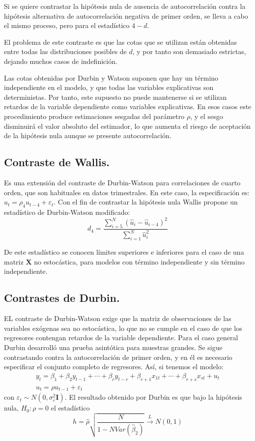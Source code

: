 Si se quiere contrastar la hip\'otesis nula de ausencia de autocorrelaci\'on
contra la hip\'otesis alternativa de autocorrelaci\'on negativa de primer
orden, se lleva a cabo el mismo proceso, pero para el estad\'istico
$4-d$.

El problema de este contraste es que las cotas que se utilizan est\'an
obtenidas entre todas las distribuciones posibles de $d$, y por tanto
son demasiado estrictas, dejando muchos casos de indefinici\'on.

Las cotas obtenidas por Durbin y Watson suponen que hay un t\'ermino
independiente en el modelo, y que todas las variables explicativas
son deterministas. Por tanto, este supuesto no puede mantenerse si
se utilizan retardos de la variable dependiente como variables explicativas.
En esos casos este procedimiento produce estimaciones sesgadas del
par\'ametro $\rho$, y el sesgo disminuir\'a el valor absoluto del estimador,
lo que aumenta el riesgo de aceptaci\'on de la hip\'otesis nula aunque
se presente autocorrelaci\'on.


\subsection{Contraste de Wallis.}

Es una extensi\'on del contraste de Durbin-Watson para correlaciones
de cuarto orden, que son habituales en datos trimestrales. En este
caso, la especificaci\'on es: $u_{t}=\rho_{4}u_{t-4}+\varepsilon_{t}$.
Con el fin de contrastar la hip\'otesis nula Wallis propone un estad\'istico
de Durbin-Watson modificado: 
\[
d_{4}=\dfrac{\sum_{i=5}^{N}\left(\hat{u}_{i}-\hat{u}_{i-4}\right)^{2}}{\sum_{i=1}^{N}\hat{u}_{i}^{2}}
\]


De este estad\'istico se conocen l\'imites superiores e inferiores para
el caso de una matriz $\boldsymbol{X}$ no estoc\'astica, para modelos
con t\'ermino independiente y sin t\'ermino independiente.


\subsection{Contrastes de Durbin.}

EL contraste de Durbin-Watson exige que la matriz de observaciones
de las variables ex\'ogenas sea no estoc\'astica, lo que no se cumple
en el caso de que los regresores contengan retardos de la variable
dependiente. Para el caso general Durbin desarroll\'o una prueba asint\'otica
para muestras grandes. Se sigue contrastando contra la autocorrelaci\'on
de primer orden, y en \'el es necesario especificar el conjunto completo
de regresores. As\'i, si tenemos el modelo: 
\[
\begin{array}{c}
y_{t}=\beta_{1}+\beta_{2}y_{t-1}+\cdots+\beta_{r}y_{t-r}+\beta_{r+1}x_{1t}+\cdots+\beta_{r+s}x_{st}+u_{t}\\
u_{t}=\rho u_{t-1}+\varepsilon_{t}
\end{array}
\]
 con $\varepsilon_{t}\sim N\left(0,\sigma_{\varepsilon}^{2}\boldsymbol{I}\right)$.
El resultado obtenido por Durbin es que bajo la hip\'otesis nula, $H_{0}:\rho=0$
el estad\'istico 
\[
h=\hat{\rho}\sqrt{\dfrac{N}{1-NVar\left(\hat{\beta}_{2}\right)}}\overset{L}{\rightarrow}N\left(0,1\right)
\]


